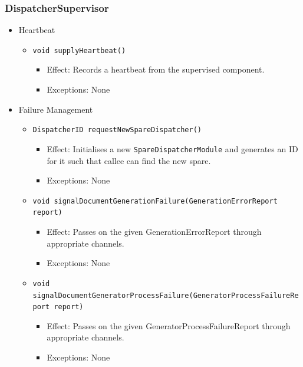 \documentclass[a4paper,10pt]{article}
\begin{document}
\subsubsection*{DispatcherSupervisor}
\begin{itemize}
	\item Heartbeat
	\begin{itemize}
		\item \texttt{void supplyHeartbeat()}
		\begin{itemize}
			\item Effect: Records a heartbeat from the supervised component.
			\item Exceptions: None
		\end{itemize}
	\end{itemize}
\end{itemize}

\begin{itemize}
	\item Failure Management
	\begin{itemize}
		\item \texttt{DispatcherID requestNewSpareDispatcher()}
		\begin{itemize}
			\item Effect: Initialises a new \texttt{SpareDispatcherModule} and generates an ID for it such that callee can find the new spare.
			\item Exceptions: None
		\end{itemize}

	    \item \texttt{void signalDocumentGenerationFailure(GenerationErrorReport report)}
	    \begin{itemize}
		    \item Effect: Passes on the given GenerationErrorReport through appropriate channels.
		    \item Exceptions: None
	    \end{itemize}

	    \item \texttt{void signalDocumentGeneratorProcessFailure(GeneratorProcessFailureReport report)}
	    \begin{itemize}
		    \item Effect: Passes on the given GeneratorProcessFailureReport through appropriate channels.
		    \item Exceptions: None
	    \end{itemize}
    \end{itemize}
\end{itemize}
\end{document}
